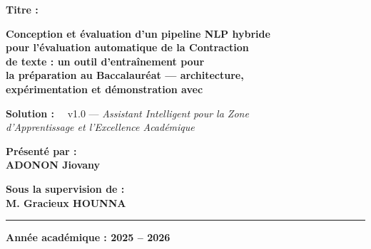 \begin{titlepage}
\begin{tcolorbox}[colback=white!95!blue,colframe=blue,sharp corners,width=\textwidth]
\centering
{\large \textbf{Titre :}}
\vspace{0.1cm}

{\Large \textbf{Conception et évaluation d'un pipeline NLP hybride\\[2pt]
pour l'évaluation automatique de la Contraction\\[2pt]
de texte : un outil d'entraînement pour\\[2pt]
la préparation au Baccalauréat — architecture,\\[2pt]
expérimentation et démonstration avec \AZIZA}}
\end{tcolorbox}

\vspace{0.3cm}

{\large \textbf{Solution :} \ \AZIZA\ v1.0  —  \textit{Assistant Intelligent pour la Zone\\
d'Apprentissage et l'Excellence Académique}}

\vspace{0.3cm}

{\large \textbf{Présenté par :}}\\
{\Large \textbf{ADONON Jiovany}}

\vspace{0.3cm}

{\large \textbf{Sous la supervision de :}}\\
{\Large \textbf{M. Gracieux HOUNNA}}

\vspace{0.2cm}
\noindent\rule{\textwidth}{0.5pt}
\vspace{0.1cm}
{\Large \textbf{Année académique : 2025 -- 2026}}

\end{titlepage}
